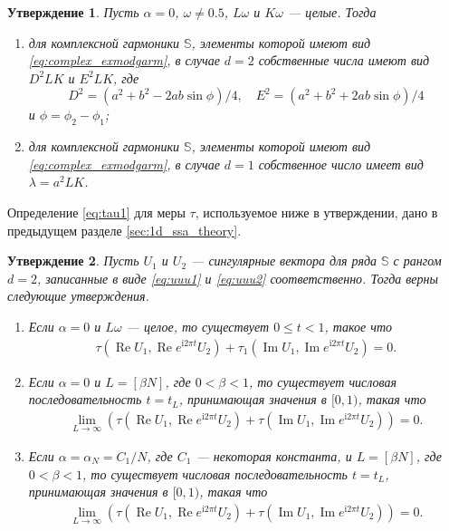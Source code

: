 \documentclass[specialist,
               substylefile = spbu.rtx,
               subf,href,colorlinks=true, 12pt]{disser}
\def\RE{\mathop{\mathrm{Re}}}
\def\IM{\mathop{\mathrm{Im}}}
\newcommand{\I}{\mathrm{i}}
\newtheorem{Th}{Утверждение}
\begin{document}
\begin{Th} \cite[Предложение 2.3]{Golyandina.etal2003} \label{th:cssa_num}
Пусть $\alpha = 0$, $\omega \not = 0.5$, $L\omega$ и $K\omega$ --- целые. Тогда 
\begin{enumerate}
\item для комплексной гармоники $\mathbb{S}$, элементы которой имеют вид \eqref{eq:complex_exmodgarm}, в случае $d=2$ собственные числа имеют вид  $D^2LK$ и $E^2LK$, где
\begin{equation*}
D^2=(a^2+b^2-2ab\sin\phi)/4, \quad E^2=(a^2+b^2+2ab\sin\phi)/4
\end{equation*} 
и $\phi=\phi_2-\phi_1$;
\item для комплексной гармоники $\mathbb{S}$, элементы которой имеют вид \eqref{eq:complex_exmodgarm}, в случае $d=1$ собственное число имеет вид $\lambda=a^2LK$.
\end{enumerate}
\end{Th}

Определение \eqref{eq:tau1} для меры $\tau$, используемое ниже в утверждении, дано в предыдущем разделе \ref{sec:1d_ssa_theory}.
\begin{Th}   \cite[Теорема 2]{Zhornikova2016} \label{th:th_tau_cssa}
Пусть $U_1$ и $U_2$ --- сингулярные вектора для ряда $\mathbb{S}$ с рангом $d=2$, записанные в виде \eqref{eq:uuu1} и \eqref{eq:uuu2} соответственно. Тогда верны следующие утверждения. 
\begin{enumerate}
\item \label{th:complex_t_1}
Если $\alpha=0$ и $L\omega$ --- целое, то существует $0 \leqslant t < 1$, такое что 
\begin{gather*}
\tau(\RE U_1, \RE e^{\I 2\pi t} U_2) + \tau_1 (\IM U_1, \IM e^{\I 2\pi t} U_2) = 0.
\end{gather*} 
\item \label{th:complex_t_4}
Если $\alpha = 0$ и $L=[\beta N]$, где $0<\beta<1$, то существует числовая последовательность $t = t_L$, принимающая значения в $[0,1)$, такая что 
\begin{gather*}
\lim_{L \rightarrow \infty} (\tau (\RE U_1, \RE e^{\I 2\pi t} U_2) + \tau (\IM U_1, \IM e^{\I 2\pi t} U_2)) = 0.
\end{gather*}
\item \label{th:complex_t_5}
Если $\alpha = \alpha_N = C_1/N$, где $C_1$ --- некоторая константа, и $L=[\beta N]$, где $0<\beta<1$, то существует числовая последовательность $t = t_L$, принимающая значения в $[0,1)$, такая что 
\begin{gather*}
\lim_{L \rightarrow \infty} (\tau (\RE U_1, \RE e^{\I 2\pi t} U_2) + \tau (\IM U_1, \IM e^{\I 2\pi t} U_2)) = 0.
\end{gather*}
\end{enumerate}
\end{Th}
\end{document}
